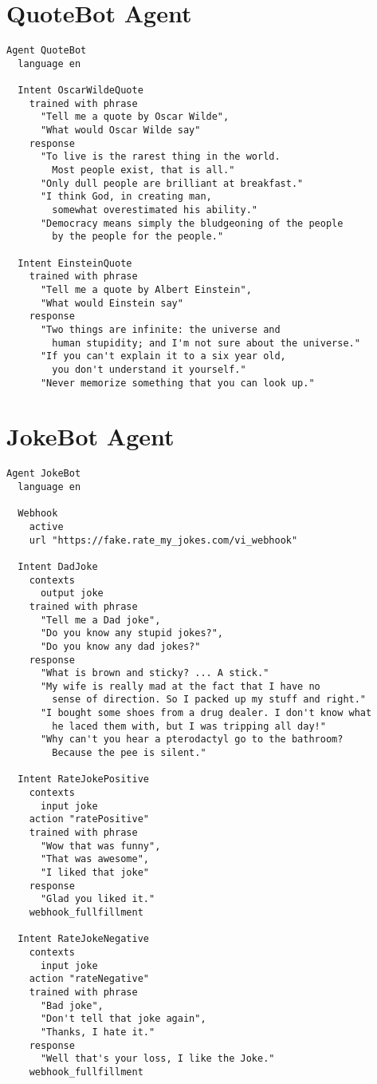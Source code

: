 \section{QuoteBot Agent}
\label{QuoteBot Agent DSL}

\begin{lstlisting}
Agent QuoteBot
  language en
  
  Intent OscarWildeQuote
    trained with phrase
      "Tell me a quote by Oscar Wilde",
      "What would Oscar Wilde say"
    response
      "To live is the rarest thing in the world. 
        Most people exist, that is all."
      "Only dull people are brilliant at breakfast."
      "I think God, in creating man,
        somewhat overestimated his ability."
      "Democracy means simply the bludgeoning of the people
        by the people for the people."
      
  Intent EinsteinQuote
    trained with phrase
      "Tell me a quote by Albert Einstein",
      "What would Einstein say"
    response
      "Two things are infinite: the universe and
        human stupidity; and I'm not sure about the universe."
      "If you can't explain it to a six year old,
        you don't understand it yourself."
      "Never memorize something that you can look up."
\end{lstlisting}


\section{JokeBot Agent}
\label{JokeBot Agent DSL}

\begin{lstlisting}
Agent JokeBot
  language en
  
  Webhook
    active
    url "https://fake.rate_my_jokes.com/vi_webhook"
  
  Intent DadJoke
    contexts 
      output joke 
    trained with phrase
      "Tell me a Dad joke",
      "Do you know any stupid jokes?",
      "Do you know any dad jokes?"
    response 
      "What is brown and sticky? ... A stick."
      "My wife is really mad at the fact that I have no
        sense of direction. So I packed up my stuff and right."
      "I bought some shoes from a drug dealer. I don't know what
        he laced them with, but I was tripping all day!"
      "Why can't you hear a pterodactyl go to the bathroom?
        Because the pee is silent."
  
  Intent RateJokePositive
    contexts 
      input joke
    action "ratePositive"
    trained with phrase
      "Wow that was funny",
      "That was awesome",
      "I liked that joke"
    response
      "Glad you liked it."
    webhook_fullfillment
  
  Intent RateJokeNegative
    contexts 
      input joke
    action "rateNegative"
    trained with phrase
      "Bad joke",
      "Don't tell that joke again",
      "Thanks, I hate it."
    response
      "Well that's your loss, I like the Joke."
    webhook_fullfillment
\end{lstlisting}



